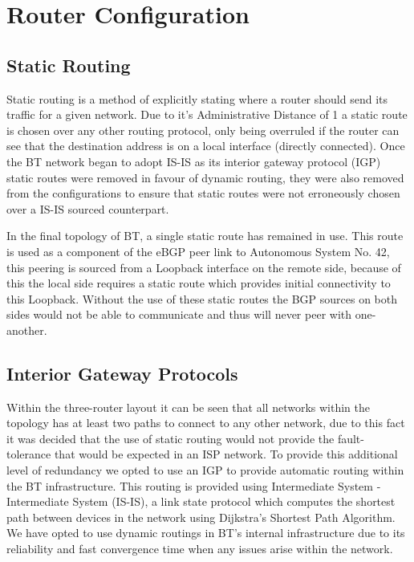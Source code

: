 \chapter{Router Configuration} \section{Static Routing} Static routing is a
method of explicitly stating where a router should send its traffic for a given
network. Due to it's Administrative Distance of 1 a static route is chosen over
any other routing protocol, only being overruled if the router can see that the
destination address is on a local interface (directly connected). Once the BT
network began to adopt IS-IS as its interior gateway protocol (IGP) static
routes were removed in favour of dynamic routing, they were also removed from
the configurations to ensure that static routes were not erroneously chosen over
a IS-IS sourced counterpart.

In the final topology of BT, a single static route has remained in use. This
route is used as a component of the eBGP peer link to Autonomous System No. 42,
this peering is sourced from a Loopback interface on the remote side, because of
this the local side requires a static route which provides initial connectivity
to this Loopback. Without the use of these static routes the BGP sources on both
sides would not be able to communicate and thus will never peer with one-
another.

\section{Interior Gateway Protocols}

Within the three-router layout it can be seen that all networks within the
topology has at least two paths to connect to any other network, due to this
fact it was decided that the use of static routing would not provide the fault-
tolerance that would be expected in an ISP network. To provide this additional
level of redundancy we opted to use an IGP to provide automatic routing within
the BT infrastructure. This routing is provided using Intermediate System -
Intermediate System (IS-IS), a link state protocol which computes the shortest
path between devices in the network using Dijkstra's Shortest Path Algorithm. We
have opted to use dynamic routings in BT's internal infrastructure due to its
reliability and fast convergence time when any issues arise within the network.

